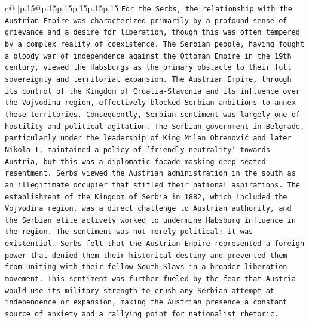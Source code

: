 \documentclass{article}
\begin{document}
{\begin{supertabular}{c@{$\;$}|p{.15\linewidth}@{}p{.15\linewidth}p{.15\linewidth}p{.15\linewidth}p{.15\linewidth}p{.15\linewidth}}
{{{\texttt{For the Serbs, the relationship with the Austrian Empire was characterized primarily by a profound sense of grievance and a desire for liberation, though this was often tempered by a complex reality of coexistence. The Serbian people, having fought a bloody war of independence against the Ottoman Empire in the 19th century, viewed the Habsburgs as the primary obstacle to their full sovereignty and territorial expansion. The Austrian Empire, through its control of the Kingdom of Croatia{-}Slavonia and its influence over the Vojvodina region, effectively blocked Serbian ambitions to annex these territories. Consequently, Serbian sentiment was largely one of hostility and political agitation. The Serbian government in Belgrade, particularly under the leadership of King Milan Obrenović and later Nikola I, maintained a policy of 'friendly neutrality' towards Austria, but this was a diplomatic facade masking deep{-}seated resentment. Serbs viewed the Austrian administration in the south as an illegitimate occupier that stifled their national aspirations. The establishment of the Kingdom of Serbia in 1882, which included the Vojvodina region, was a direct challenge to Austrian authority, and the Serbian elite actively worked to undermine Habsburg influence in the region. The sentiment was not merely political; it was existential. Serbs felt that the Austrian Empire represented a foreign power that denied them their historical destiny and prevented them from uniting with their fellow South Slavs in a broader liberation movement. This sentiment was further fueled by the fear that Austria would use its military strength to crush any Serbian attempt at independence or expansion, making the Austrian presence a constant source of anxiety and a rallying point for nationalist rhetoric.} \\
\\ 
}}}
\end{supertabular}}
\end{document}
